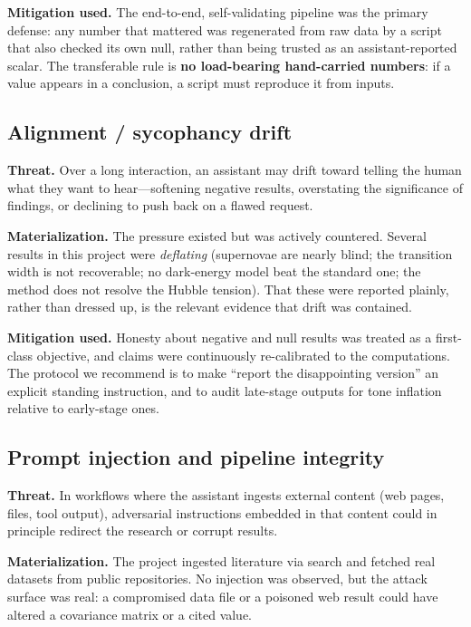 \documentclass[11pt]{article}
\begin{document}
\textbf{Mitigation used.} The end-to-end, self-validating pipeline was the primary
defense: any number that mattered was regenerated from raw data by a script that
also checked its own null, rather than being trusted as an assistant-reported
scalar. The transferable rule is \textbf{no load-bearing hand-carried numbers}: if
a value appears in a conclusion, a script must reproduce it from inputs.

\subsection{Alignment / sycophancy drift}

\textbf{Threat.} Over a long interaction, an assistant may drift toward telling the
human what they want to hear---softening negative results, overstating the
significance of findings, or declining to push back on a flawed request.

\textbf{Materialization.} The pressure existed but was actively countered. Several
results in this project were \emph{deflating} (supernovae are nearly blind; the
transition width is not recoverable; no dark-energy model beat the standard one;
the method does not resolve the Hubble tension). That these were reported plainly,
rather than dressed up, is the relevant evidence that drift was contained.

\textbf{Mitigation used.} Honesty about negative and null results was treated as a
first-class objective, and claims were continuously re-calibrated to the
computations. The protocol we recommend is to make ``report the disappointing
version'' an explicit standing instruction, and to audit late-stage outputs for
tone inflation relative to early-stage ones.

\subsection{Prompt injection and pipeline integrity}

\textbf{Threat.} In workflows where the assistant ingests external content (web
pages, files, tool output), adversarial instructions embedded in that content could
in principle redirect the research or corrupt results.

\textbf{Materialization.} The project ingested literature via search and fetched
real datasets from public repositories. No injection was observed, but the attack
surface was real: a compromised data file or a poisoned web result could have
altered a covariance matrix or a cited value.
\end{document}
